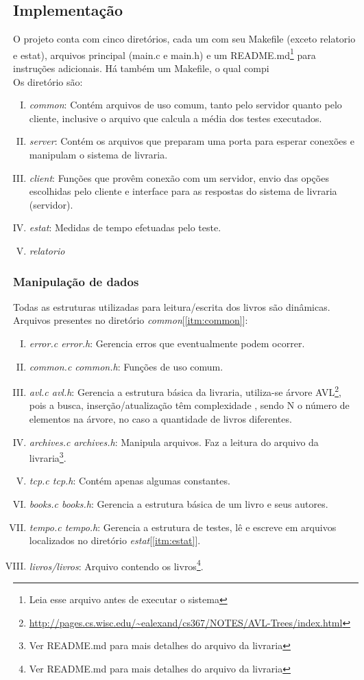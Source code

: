\documentclass[a4paper,10pt]{article}
\begin{document}
\subsection{Implementação}
O projeto conta com cinco diretórios, cada um com seu Makefile (exceto relatorio e estat), arquivos
principal (main.c e main.h) e um README.md\footnote{Leia esse arquivo antes de
executar o sistema} para instruções adicionais. Há também um Makefile, o qual 
compi
\\Os diretório são:
\begin{enumerate}[I.]
\label{sec:dirs}
\item \label{itm:common} \emph{common}: Contém arquivos de uso comum, tanto pelo servidor quanto 
pelo cliente, inclusive o arquivo que calcula a média dos testes executados.
\item \label{itm:server} \emph{server}: Contém os arquivos que preparam uma porta para esperar
conexões e manipulam o sistema de livraria.
\item \label{itm:client} \emph{client}: Funções que provêm conexão com um servidor, envio das opções
escolhidas pelo cliente e interface para as respostas do sistema de livraria
(servidor).
\item \label{itm:estat} \emph{estat}: Medidas de tempo efetuadas pelo teste.
\item \label{itm:relatorio} \emph{relatorio}
\end{enumerate}
\subsubsection{Manipulação de dados}
Todas as estruturas utilizadas para leitura/escrita dos livros são dinâmicas. \\Arquivos presentes no diretório \emph{common}[\ref{itm:common}]:
\begin{enumerate}[I.]
\item \emph{error.c error.h}: Gerencia erros que eventualmente podem ocorrer.
\item \emph{common.c common.h}: Funções de uso comum.
\item \label{itm:avl} \emph{avl.c avl.h}: Gerencia a estrutura básica da livraria, utiliza-se 
árvore AVL\footnote{ \url{http://pages.cs.wisc.edu/~ealexand/cs367/NOTES/AVL-Trees/index.html} }, pois a busca, inserção/atualização têm complexidade  , sendo N
o número de elementos na árvore, no caso a quantidade de livros diferentes.
\item \emph{archives.c archives.h}: Manipula arquivos. Faz a leitura do arquivo
da livraria\footnote{Ver README.md para mais detalhes do arquivo da livraria}.
\item \label{itm:tcp} \emph{tcp.c tcp.h}: Contém apenas algumas constantes.
\item \emph{books.c books.h}: Gerencia a estrutura básica de um livro e seus autores.
\item \label{itm:tempo}\emph{tempo.c tempo.h}: Gerencia a estrutura de testes, lê e escreve em arquivos localizados no diretório \emph{estat}[\ref{itm:estat}].
\item \emph{livros/livros}: Arquivo contendo os livros\footnote{Ver README.md para mais detalhes do arquivo da livraria}.
\end{enumerate}
\end{document}
